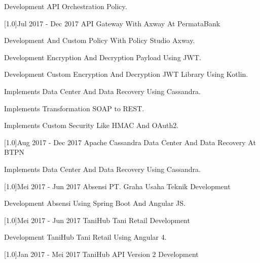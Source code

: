 \documentclass[english]{cv-style}
\begin{document}
\begin{entrylist}
{\begin{itemize}
{    \item Development API Orchestration Policy.}
  \end{itemize}}
\entry
{\scalebox{.6}[1.0]{Jul 2017 - Dec 2017}}
{API Gateway With Axway At PermataBank}
{}
{\vspace{-0.3cm}
  \begin{itemize}\small{
    \item Development And Custom Policy With Policy Studio Axway.
    \item Development Encryption And Decryption Payload Using JWT.
    \item Development Custom Encryption And Decryption JWT Library Using Kotlin.
    \item Implements Data Center And Data Recovery Using Cassandra.
    \item Implements Transformation SOAP to REST.
    \item Implements Custom Security Like HMAC And OAuth2.}
  \end{itemize}}
\entry
{\scalebox{.6}[1.0]{Aug 2017 - Dec 2017}}
{Apache Cassandra Data Center And Data Recovery At BTPN}
{}
{\vspace{-0.3cm}
  \begin{itemize}\small{
    \item Implements Data Center And Data Recovery Using Cassandra.}
  \end{itemize}}
\entry
{\scalebox{.6}[1.0]{Mei 2017 - Jun 2017}}
{Absensi PT. Graha Usaha Teknik Development}
{}
{\vspace{-0.3cm}
  \begin{itemize}\small{
    \item Development Absensi Using Spring Boot And Angular JS.}
  \end{itemize}}
\entry
{\scalebox{.6}[1.0]{Mei 2017 - Jun 2017}}
{TaniHub Tani Retail Development}
{}
{\vspace{-0.3cm}
  \begin{itemize}\small{
    \item Development TaniHub Tani Retail Using Angular 4.}
  \end{itemize}}
\entry
{\scalebox{.6}[1.0]{Jan 2017 - Mei 2017}}
{TaniHub API Version 2 Development}
{}
{\vspace{-0.3cm}
  \begin{itemize}\small{
}
\end{itemize}}
\end{entrylist}
\end{document}
